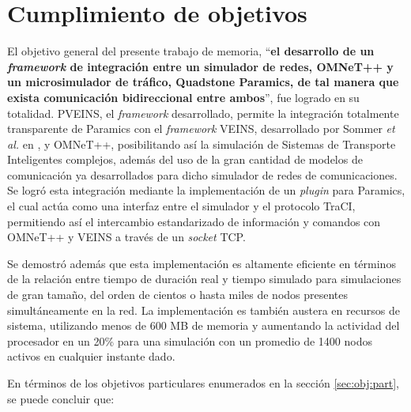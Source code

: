 \section{Cumplimiento de objetivos}

El objetivo general del presente trabajo de memoria, ``\textbf{el desarrollo de un \textit{framework} de integración entre un simulador de redes, OMNeT++ y un microsimulador de tráfico, Quadstone Paramics, de tal manera que exista comunicación bidireccional entre ambos}'', fue logrado en su totalidad. PVEINS, el \emph{framework} desarrollado, permite la integración totalmente transparente de Paramics con el \emph{framework} VEINS, desarrollado por Sommer \emph{et al.} en \autocite{sommer_german_dressler}, y OMNeT++, posibilitando así la simulación de Sistemas de Transporte Inteligentes complejos, además del uso de la gran cantidad de modelos de comunicación ya desarrollados para dicho simulador de redes de comunicaciones. 
Se logró esta integración mediante la implementación de un \emph{plugin} para Paramics, el cual actúa como una interfaz entre el simulador y el protocolo TraCI, permitiendo así el intercambio estandarizado de información y comandos con OMNeT++ y VEINS a través de un \emph{socket} TCP. 

Se demostró además que esta implementación es altamente eficiente en términos de la relación entre tiempo de duración real y tiempo simulado para simulaciones de gran tamaño, del orden de cientos o hasta miles de nodos presentes simultáneamente en la red. 
La implementación es también austera en recursos de sistema, utilizando menos de 600 MB de memoria y aumentando la actividad del procesador en un 20\% para una simulación con un promedio de 1400 nodos activos en cualquier instante dado.

En términos de los objetivos particulares enumerados en la sección \ref{sec:obj:part}, se puede concluir que:

